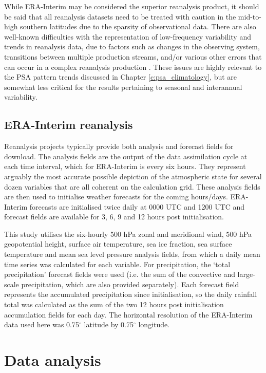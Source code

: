While ERA-Interim may be considered the superior reanalysis product, it should be said that all reanalysis datasets need to be treated with caution in the mid-to-high southern latitudes due to the sparsity of observational data. There are also well-known difficulties with the representation of low-frequency variability and trends in reanalysis data, due to factors such as changes in the observing system, transitions between multiple production streams, and/or various other errors that can occur in a complex reanalysis production \citep{Dee2014}. These issues are highly relevant to the PSA pattern trends discussed in Chapter \ref{c:psa_climatology}, but are somewhat less critical for the results pertaining to seasonal and interannual variability.

\subsection{ERA-Interim reanalysis}

Reanalysis projects typically provide both analysis and forecast fields for download. The analysis fields are the output of the data assimilation cycle at each time interval, which for ERA-Interim is every six hours. They represent arguably the most accurate possible depiction of the atmospheric state for several dozen variables that are all coherent on the calculation grid. These analysis fields are then used to initialise weather forecasts for the coming hours/days. ERA-Interim forecasts are initialised twice daily at 0000 UTC and 1200 UTC and forecast fields are available for 3, 6, 9 and 12 hours post initialisation.  

This study utilises the six-hourly 500 hPa zonal and meridional wind, 500 hPa geopotential height, surface air temperature, sea ice fraction, sea surface temperature and mean sea level pressure analysis fields, from which a daily mean time series was calculated for each variable. For precipitation, the `total precipitation' forecast fields were used (i.e. the sum of the convective and large-scale precipitation, which are also provided separately). Each forecast field represents the accumulated precipitation since initialisation, so the daily rainfall total was calculated as the sum of the two 12 hours post initialisation accumulation fields for each day. The horizontal resolution of the ERA-Interim data used here was 0.75$^{\circ}$ latitude by 0.75$^{\circ}$ longitude. 


\section{Data analysis}

